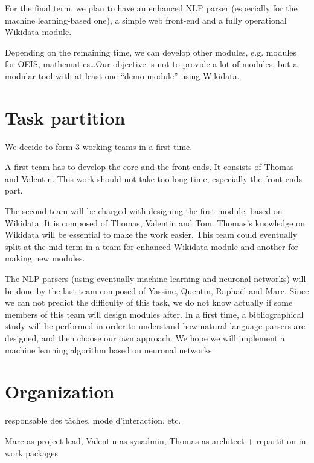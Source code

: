 \documentclass[a4paper,10pt]{article}
\begin{document}
For the final term, we plan to have an enhanced NLP parser (especially for the machine learning-based one), a simple web front-end and a fully operational Wikidata module.

Depending on the remaining time, we can develop other modules, e.g. modules for OEIS, mathematics\ldots Our objective is not to provide a lot of modules, but a modular tool with at least one ``demo-module'' using Wikidata.

\section{Task partition}

We decide to form 3 working teams in a first time.

A first team has to develop the core and the front-ends. It consists of Thomas and Valentin. This work should not take too long time, especially the front-ends part.

The second team will be charged with designing the first module, based on Wikidata. It is composed of Thomas, Valentin and Tom. Thomas's knowledge on Wikidata will be essential to make the work easier. This team could eventually split at the mid-term in a team for enhanced Wikidata module and another for making new modules.

The NLP parsers (using eventually machine learning and neuronal networks) will be done by the last team composed of Yassine, Quentin, Raphaël and Marc. Since we can not predict the difficulty of this task, we do not know actually if some members of this team will design modules after. In a first time, a bibliographical study will be performed in order to understand how natural language parsers are designed, and then choose our own approach. We hope we will implement a machine learning algorithm based on neuronal networks. 



\section{Organization}

responsable des tâches, mode d’interaction, etc.

Marc as project lead, Valentin as sysadmin, Thomas as architect + repartition in work packages

\end{document}
